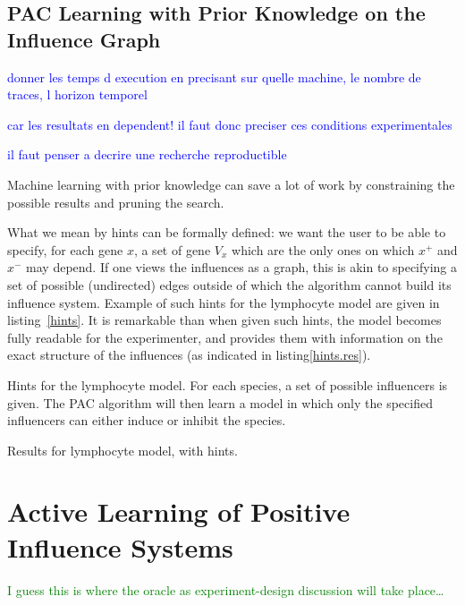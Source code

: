 \documentclass{llncs}
\newcommand{\francois}[1]{\textcolor{blue}{#1}}
\newcommand{\sylvain}[1]{\textcolor{green}{#1}}
\begin{document}
\subsection{PAC Learning with Prior Knowledge on the Influence Graph}

\francois{donner les temps d execution en precisant sur quelle machine, le nombre de traces, l horizon temporel }

\francois{car les resultats en dependent! il faut donc preciser ces conditions experimentales}

\francois{il faut penser a decrire une recherche reproductible}


Machine learning with prior knowledge can save a lot of work by constraining the possible results and pruning the search.

What we mean by hints can be formally defined: we want the user to be able to specify, for each gene $x$, a set of gene $V_x$ which are the only ones on which $x^+$ and $x^-$ may depend. If one views the influences as a graph, this is akin to specifying a set of possible (undirected) edges outside of which the algorithm cannot build its influence system. Example of such hints for the lymphocyte model are given in listing~\ref{hints}. It is remarkable than when given such hints, the model becomes fully readable for the experimenter, and provides them with information on the exact structure of the influences (as indicated in listing\ref{hints.res}).

\begin{listfig}[htb]
	
	\caption{Hints for the lymphocyte model. For each species, a set of possible influencers is given. The PAC algorithm will then learn a model in which only the specified influencers can either induce or inhibit the species.\label{hints}}
\end{listfig}



\begin{listfig}
	
	\caption{Results for lymphocyte model, with hints.\label{hints.res}}
\end{listfig}


\section{Active Learning of Positive Influence Systems}
\label{sec:oracles}

\sylvain{I guess this is where the oracle as experiment-design discussion will
take place\dots}
\end{document}
